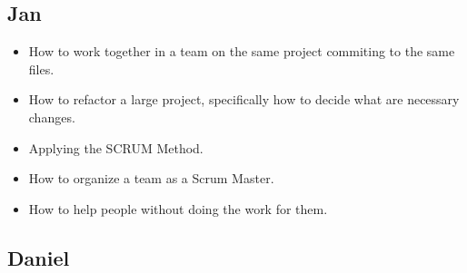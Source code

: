 \documentclass{article}
\begin{document}
\subsection*{Jan}
\begin{itemize}
	\item How to work together in a team on the same project commiting to the same files.
	\item How to refactor a large project, specifically how to decide what are necessary changes.
	\item Applying the SCRUM Method.
	\item How to organize a team as a Scrum Master.
	\item How to help people without doing the work for them.
\end{itemize}
\subsection*{Daniel} 
\end{document}
